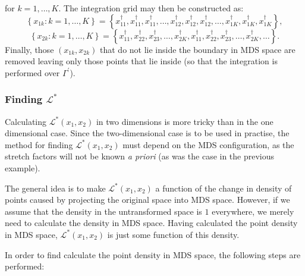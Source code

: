 for $k=1,\dots,K$. The integration grid may then be constructed as:
\begin{equation*}
\left \{x_{1k} : k=1,\dots,K \right \} = \left \{x^\dagger_{11},x^\dagger_{11},x^\dagger_{11},\dots, x^\dagger_{12}, x^\dagger_{12}, x^\dagger_{12},\dots, x^\dagger_{1K}, x^\dagger_{1K}, x^\dagger_{1K}\right \},
\end{equation*}
\begin{equation*}
\left \{x_{2k} : k=1,\dots,K \right \} = \left \{x^\dagger_{11},x^\dagger_{22}, x^\dagger_{23},\dots, x^\dagger_{2K},x^\dagger_{11},x^\dagger_{22}, x^\dagger_{23},\dots, x^\dagger_{2K},\dots\right \}.
\end{equation*}
Finally, those $(x_{1k},x_{2k})$ that do not lie inside the boundary in MDS space are removed leaving only those points that lie inside (so that the integration is performed over $\Gamma^\prime$).

\subsubsection{Finding $\mathcal{L}^*$}

Calculating $\mathcal{L}^*(x_1,x_2)$ in two dimensions is more tricky than in the one dimensional case. Since the two-dimensional case is to be used in practise, the method for finding $\mathcal{L}^*(x_1,x_2)$ must depend on the MDS configuration, as the stretch factors will not be known \emph{a priori} (as was the case in the previous example).

The general idea is to make $\mathcal{L}^*(x_1,x_2)$ a function of the change in density of points caused by projecting the original space into MDS space. However, if we assume that the density in the untransformed space is $1$ everywhere, we merely need to calculate the density in MDS space. Having calculated the point density in MDS space, $\mathcal{L}^*(x_1,x_2)$ is just some function of this density.

In order to find calculate the point density in MDS space, the following steps are performed:

